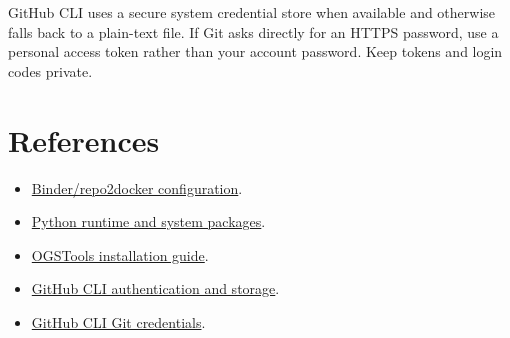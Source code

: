 \documentclass[11pt,a4paper]{tubaf-report}
\begin{document}
GitHub CLI uses a secure system credential store when available and otherwise falls back to a plain-text file. If Git asks directly for an HTTPS password, use a personal access token rather than your account password. Keep tokens and login codes private.
\section{References}
\begin{itemize}
\item \href{https://repo2docker.readthedocs.io/en/latest/configuration/}{Binder/repo2docker configuration}.
\item \href{https://repo2docker.readthedocs.io/en/latest/configuration/system/}{Python runtime and system packages}.
\item \href{https://ogstools.opengeosys.org/stable/user-guide/index.html}{OGSTools installation guide}.
\item \href{https://cli.github.com/manual/gh_auth_login}{GitHub CLI authentication and storage}.
\item \href{https://cli.github.com/manual/gh_auth_setup-git}{GitHub CLI Git credentials}.
\end{itemize}
\end{document}
